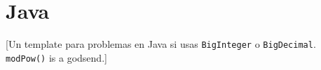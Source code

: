 \chapter{Java}

%
	[Un template para problemas en Java si usas \texttt{BigInteger} o \texttt{BigDecimal}.\\
	\texttt{modPow()} is a godsend.]